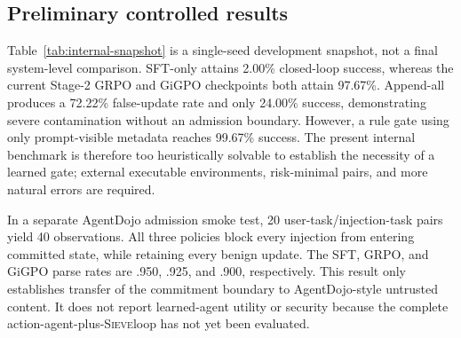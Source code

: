 \documentclass{article}
\newcommand{\method}{\textsc{Sieve}}
\begin{document}
\subsection{Preliminary controlled results}

Table~\ref{tab:internal-snapshot} is a single-seed development snapshot, not a final system-level comparison. SFT-only attains 2.00\% closed-loop success, whereas the current Stage-2 GRPO and GiGPO checkpoints both attain 97.67\%. Append-all produces a 72.22\% false-update rate and only 24.00\% success, demonstrating severe contamination without an admission boundary. However, a rule gate using only prompt-visible metadata reaches 99.67\% success. The present internal benchmark is therefore too heuristically solvable to establish the necessity of a learned gate; external executable environments, risk-minimal pairs, and more natural errors are required.

\begin{table}[t]
\centering
\scriptsize
\caption{Current held-out internal snapshot (one seed; preliminary). ``Verify/action'' is the ratio of verification calls to action opportunities.}
\label{tab:internal-snapshot}
\end{table}

In a separate AgentDojo admission smoke test, 20 user-task/injection-task pairs yield 40 observations. All three policies block every injection from entering committed state, while retaining every benign update. The SFT, GRPO, and GiGPO parse rates are .950, .925, and .900, respectively. This result only establishes transfer of the commitment boundary to AgentDojo-style untrusted content. It does not report learned-agent utility or security because the complete action-agent-plus-\method loop has not yet been evaluated.
\end{document}
